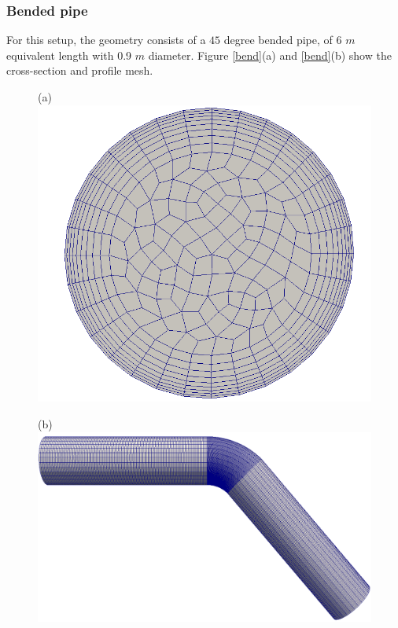 \documentclass[11pt]{report}
\begin{document}
\begin{minipage}[t]{0.35\textwidth}
\begin{minipage}[t]{0.5\textwidth}
\begin{minipage}[t]{0.35\textwidth}
 \subsubsection{Bended pipe}\label{bended}
 For this setup, the geometry consists of a $45$ degree bended pipe, of 6 $m$ equivalent length with 0.9 $m$ diameter. Figure \ref{bend}(a) and \ref{bend}(b) show the cross-section and profile mesh.\\
 \begin{minipage}[t]{0.35\textwidth}
 \begin{figure}[ht!]
 \begin{center}
 (a)\includegraphics[scale =0.09]{figs/section.png}
 \label{fig:gauss}
 \end{center}
 \end{figure}
%
 \begin{figure}[ht!]
 (b)\includegraphics[scale = 0.17]{figs/bend.png}

\end{figure}
\end{minipage}
\end{minipage}
\end{minipage}
\end{minipage}
\end{document}

